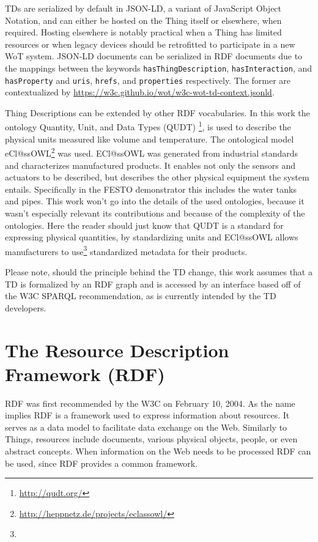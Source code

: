 TDs are serialized by default in JSON-LD, a variant of JavaScript Object Notation, and can either be hosted on the Thing itself or elsewhere, when required. Hosting elsewhere is notably practical when a Thing has limited resources or when legacy devices should be retrofitted to participate in a new WoT system. JSON-LD documents can be serialized in RDF documents due to the mappings between the keywords \texttt{hasThingDescription}, \texttt{hasInteraction}, and \texttt{hasProperty} and \texttt{uris}, \texttt{hrefs}, and \texttt{properties} respectively. The former are contextualized by \url{https://w3c.github.io/wot/w3c-wot-td-context.jsonld}. 



Thing Descriptions can be extended by other RDF vocabularies.\cite{Kabisch.2017} In this work the ontology Quantity, Unit, and Data Types (QUDT) \footnote{\url{http://qudt.org/}}, is used to describe the physical units measured like volume and temperature. The ontological model eCl@ssOWL\footnote{\url{http://heppnetz.de/projects/eclassowl/}} was used. ECl@ssOWL was generated from industrial standards and characterizes manufactured products. It enables not only the sensors and actuators to be described, but describes the other physical equipment the system entails. Specifically in the FESTO demonstrator this includes the water tanks and pipes. This work won't go into the details of the used ontologies, because it wasn't especially relevant its contributions and because of the complexity of the ontologies. Here the reader should just know that QUDT is a standard for expressing physical quantities, by standardizing units and ECl@ssOWL allows manufacturers to use\footnote{} standardized metadata for their products. 



Please note, should the principle behind the TD change, this work assumes that a TD is formalized by an RDF graph and is accessed by an interface based off of the W3C SPARQL recommendation, as is currently intended by the TD developers.



\section{The Resource Description Framework (RDF)}
RDF was first recommended by the W3C on February 10, 2004. As the name implies RDF is a framework used to express information about resources. It serves as a data model to facilitate data exchange on the Web. Similarly to Things, resources include documents, various physical objects, people, or even abstract concepts. When information on the Web needs to be processed RDF can be used, since RDF provides a common framework.

